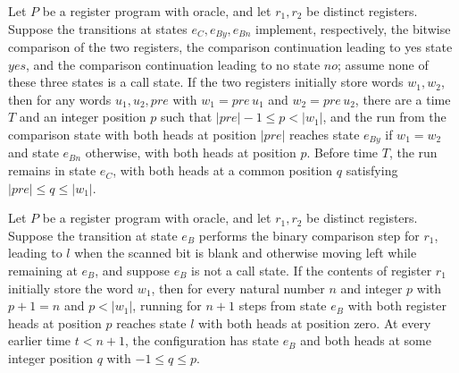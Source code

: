 \begin{lemma}
\label{Complexity.LogProg.eqC_run}
\leanok
{}
Let $P$ be a register program with oracle, and let $r_1,r_2$ be distinct registers.
Suppose the transitions at states $e_C,e_{By},e_{Bn}$ implement, respectively, the
bitwise comparison of the two registers, the comparison continuation leading to yes
state $yes$, and the comparison continuation leading to no state $no$; assume none of
these three states is a call state. If the two registers initially store words
$w_1,w_2$, then for any words $u_1,u_2,pre$ with $w_1=pre\,u_1$ and $w_2=pre\,u_2$,
there are a time $T$ and an integer position $p$ such that $|pre|-1\le p<|w_1|$, and the
run from the comparison state with both heads at position $|pre|$ reaches state $e_{By}$
if $w_1=w_2$ and state $e_{Bn}$ otherwise, with both heads at position $p$. Before time
$T$, the run remains in state $e_C$, with both heads at a common position $q$ satisfying
$|pre|\le q\le |w_1|$.
\end{lemma}

\begin{lemma}
\label{Complexity.LogProg.eqB_run}
\leanok
{}
Let $P$ be a register program with oracle, and let $r_1,r_2$ be distinct registers.
Suppose the transition at state $e_B$ performs the binary comparison step for $r_1$,
leading to $l$ when the scanned bit is blank and otherwise moving left while remaining
at $e_B$, and suppose $e_B$ is not a call state. If the contents of register $r_1$
initially store the word $w_1$, then for every natural number $n$ and integer $p$ with
$p+1=n$ and $p<|w_1|$, running for $n+1$ steps from state $e_B$ with both register heads
at position $p$ reaches state $l$ with both heads at position zero. At every earlier
time $t<n+1$, the configuration has state $e_B$ and both heads at some integer position
$q$ with $-1\le q\le p$.
\end{lemma}

